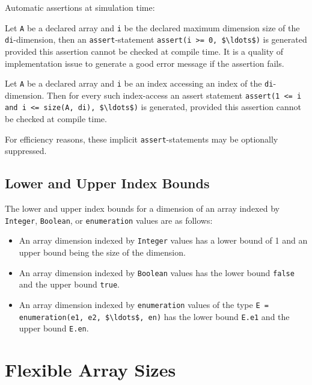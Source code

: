 \begin{nonnormative}
Automatic assertions at simulation time:

Let \lstinline!A! be a declared array and \lstinline!i! be the declared maximum dimension size of the \lstinline!di!-dimension, then an \lstinline!assert!-statement \lstinline!assert(i >= 0, $\ldots$)! is generated provided this assertion cannot be checked at compile time.
It is a quality of implementation issue to generate a good error message if the assertion fails.

Let \lstinline!A! be a declared array and \lstinline!i! be an index accessing an index of the \lstinline!di!-dimension.
Then for every such index-access an assert statement \lstinline!assert(1 <= i and i <= size(A, di), $\ldots$)! is generated, provided this assertion cannot be checked at compile time.

For efficiency reasons, these implicit \lstinline!assert!-statements may be optionally suppressed.
\end{nonnormative}

\subsection{Lower and Upper Index Bounds}\label{array-dimension-lower-and-upper-index-bounds}\label{lower-and-upper-index-bounds}

The lower and upper index bounds for a dimension of an array indexed by \lstinline!Integer!, \lstinline!Boolean!, or \lstinline!enumeration! values are as follows:
\begin{itemize}
\item
  An array dimension indexed by \lstinline!Integer! values has a lower bound of 1 and an upper bound being the size of the dimension.
\item
  An array dimension indexed by \lstinline!Boolean! values has the lower bound \lstinline!false! and the upper bound \lstinline!true!.
\item
  An array dimension indexed by \lstinline!enumeration! values of the type \lstinline!E = enumeration(e1, e2, $\ldots$, en)!
  has the lower bound \lstinline!E.e1! and the upper bound \lstinline!E.en!.
\end{itemize}

\section{Flexible Array Sizes}\label{flexible-array-sizes}

